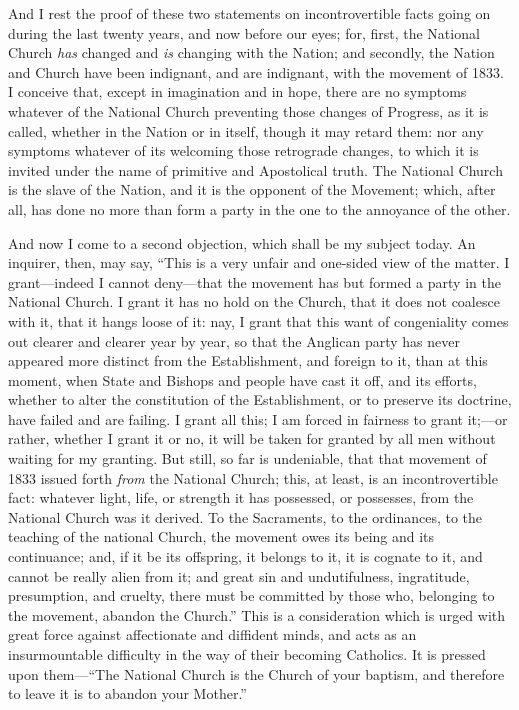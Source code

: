 And I rest the proof of these two statements on incontrovertible
facts going on during the last twenty years, and now before our eyes;
for, first, the National Church \emph{has} changed and \emph{is}
changing with the Nation; and secondly, the Nation and Church have
been indignant, and are indignant, with the movement of 1833. I
conceive that, except in imagination and in hope, there are no
symptoms whatever of the National Church preventing those changes of
Progress, as it is called, whether in the Nation or in itself, though
it may retard them: nor any symptoms whatever of its welcoming those
retrograde changes, to which it is invited under the name of primitive
and Apostolical truth. The National Church is the slave of the Nation,
and it is the opponent of the Movement; which, after all, has done no
more than form a party in the one to the annoyance of the other.

And now I come to a second objection, which shall be my subject
today. An inquirer, then, may say, ``This is a very unfair and
one-sided view of the matter. I grant—indeed I cannot deny—that
the movement has but formed a party in the National Church. I grant it
has no hold on the Church, that it does not coalesce with it, that it
hangs loose of it: nay, I grant that this want of congeniality comes
out clearer and clearer year by year, so that the Anglican party has
never appeared more distinct from the Establishment, and foreign to
it, than at this moment, when State and Bishops and people have cast
it off, and its efforts, whether to alter the constitution of the
Establishment, or to preserve its doctrine, have failed and are
failing. I grant all this; I am forced in fairness to grant it;—or
rather, whether I grant it or no, it will be taken for granted by all
men without waiting for my granting. But still, so far is undeniable,
that that movement of 1833 issued forth \emph{from} the National
Church; this, at least, is an incontrovertible fact: whatever light,
life, or strength it has possessed, or possesses, from the National
Church was it derived. To the Sacraments, to the ordinances, to the
teaching of the national Church, the movement owes its being and its
continuance; and, if it be its offspring, it belongs to it, it is
cognate to it, and cannot be really alien from it; and great sin and
undutifulness, ingratitude, presumption, and cruelty, there must be
committed by those who, belonging to the movement, abandon the
Church.'' This is a consideration which is urged with great force
against affectionate and diffident minds, and acts as an
insurmountable difficulty in the way of their becoming Catholics. It
is pressed upon them—``The National Church is the Church of your
baptism, and therefore to leave it is to abandon your Mother.''

